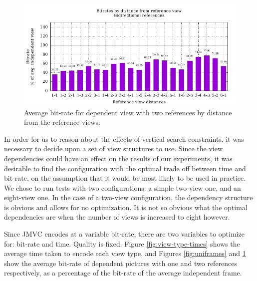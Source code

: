 \documentclass{sig-alternate-05-2015}
\begin{document}
\begin{figure}[h]
\centering
\includegraphics[scale=.68]{figures/motion_vector_data_unconstrained_bidirectional.pdf}
\caption{
Average bit-rate for dependent view with two references by distance from the
reference views.
}
\label{fig:biframes}
\end{figure}

In order for us to reason about the effects of vertical search constraints, it
was necessary to decide upon a set of view structures to use. Since the
view dependencies could have an effect on the results of our experiments, it was
desirable to find the configuration with the optimal trade off between time and
bit-rate, on the assumption that it would be most likely to be used in
practice. We chose to run tests with two configurations: a simple two-view one,
and an eight-view one. In the case of a two-view configuration, the dependency
structure is obvious and allows for no optimization. It is not so obvious what
the optimal dependencies are when the number of views is increased to eight
however.

Since JMVC encodes at a variable bit-rate, there are two variables to optimize
for: bit-rate and time. Quality is fixed. Figure \ref{fig:view-type-times} shows
the average time taken to encode each view type, and Figures \ref{fig:uniframes}
and \ref{fig:biframes} show the average bit-rate of dependent pictures with one
and two references respectively, as a percentage of the bit-rate of
the average independent frame.
\end{document}
